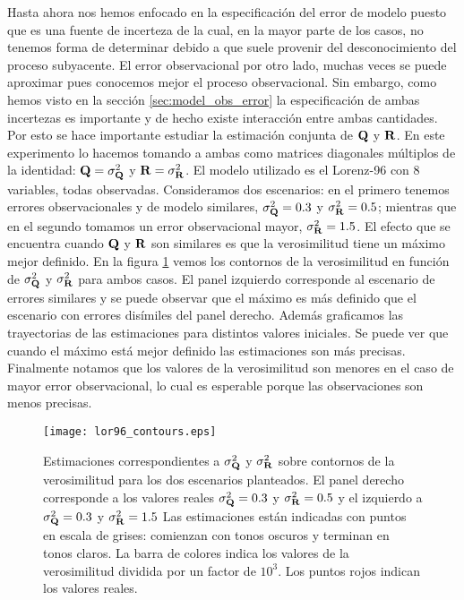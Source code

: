 Hasta ahora nos hemos enfocado en la especificación del error de modelo puesto que es una fuente de incerteza de la cual, en la mayor parte de los casos, no tenemos forma de determinar debido a que suele provenir del desconocimiento del proceso subyacente. El error observacional por otro lado, muchas veces se puede aproximar pues conocemos mejor el proceso observacional. Sin embargo, como hemos visto en la sección \ref{sec:model_obs_error} la especificación de ambas incertezas es importante y de hecho existe interacción entre ambas cantidades. Por esto se hace importante estudiar la estimación conjunta de $\mathbf{Q}$ y $\mathbf{R}$. En este experimento lo hacemos tomando a ambas como matrices diagonales múltiplos de la identidad: $\mathbf{Q} = \sigma_{\mathbf{Q}}^2$ y $\mathbf{R} = \sigma_{\mathbf{R}}^2$. El modelo utilizado es el Lorenz-96 con 8 variables, todas observadas. Consideramos dos escenarios: en el primero tenemos errores observacionales y de modelo similares, $\sigma_{\mathbf{Q}}^2 = 0.3$ y $\sigma_{\mathbf{R}}^2 = 0.5$; mientras que en el segundo tomamos un error observacional mayor, $\sigma_{\mathbf{R}}^2 = 1.5$. El efecto que se encuentra cuando $\mathbf{Q}$ y $\mathbf{R}$ son similares es que la verosimilitud tiene un máximo mejor definido. En la figura \ref{fig:lor96_contours} vemos los contornos de la verosimilitud en función de $\sigma_{\mathbf{Q}}^2$ y $\sigma_{\mathbf{R}}^2$ para ambos casos. El panel izquierdo corresponde al escenario de errores similares y se puede observar que el máximo es más definido que el escenario con errores disímiles del panel derecho. Además graficamos las trayectorias de las estimaciones para distintos valores iniciales. Se puede ver que cuando el máximo está mejor definido las estimaciones son más precisas. Finalmente notamos que los valores de la verosimilitud son menores en el caso de mayor error observacional, lo cual es esperable porque las observaciones son menos precisas.

\begin{figure}[h]
    \centering
    \texttt{[image: lor96\_contours.eps]}
    \caption{Estimaciones correspondientes a $\sigma_{\mathbf{Q}}^2$ y $\sigma_{\mathbf{R}}^2$ sobre contornos de la verosimilitud para los dos escenarios planteados. El panel derecho corresponde a los valores reales $\sigma_{\mathbf{Q}}^2 = 0.3$ y $\sigma_{\mathbf{R}}^2 = 0.5$ y el izquierdo a $\sigma_{\mathbf{Q}}^2 = 0.3$ y $\sigma_{\mathbf{R}}^2 = 1.5$ Las estimaciones están indicadas con puntos en escala de grises: comienzan con tonos oscuros y terminan en tonos claros. La barra de colores indica los valores de la verosimilitud dividida por un factor de $10^3$. Los puntos rojos indican los valores reales.}
    \label{fig:lor96_contours}
\end{figure}

